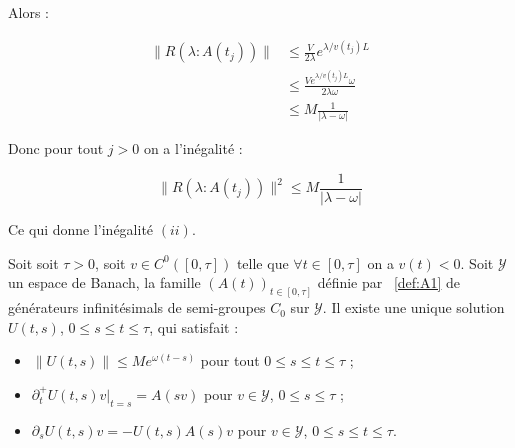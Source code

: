 \documentclass[a4paper]{article}
\begin{document}
\begin{preuve}
	Alors :
	
	\[
	\begin{split}
		\displaystyle \|R(\lambda:A(t_j)) \| &\leq  \frac{V}{2\lambda} e^{\lambda/v(t_j)L}\\
		                                     &\leq \frac{ V e^{\lambda/v(t_j)L} \omega}{2\lambda \omega}\\
											 &\leq M \frac{1}{|\lambda - \omega|}
	\end{split}
	\]
	
 	Donc pour tout $j>0$ on a l'inégalité :
	
 	\begin{equation}
 		\displaystyle \|R(\lambda:A(t_j)) \|^2 \leq M \frac{1}{|\lambda - \omega|}
 	\end{equation}
	
	Ce qui donne l'inégalité $(ii)$.
\end{preuve}

\begin{proposition}
	\label{prop:cas1}
	Soit soit $\tau>0$, soit $v \in C^0([0,\tau])$ telle que $\forall t \in [0,\tau]$ on a $v(t)<0$.
	Soit $\mathscr{Y}$ un espace de Banach, la famille $(A(t))_{t \in [0,\tau]}$ 
	définie par ~\eqref{def:A1}
	de générateurs infinitésimals de semi-groupes $C_0$ sur $\mathscr{Y}$.
	Il existe une unique solution $U(t,s)$, $0\leq s \leq t \leq \tau $, qui satisfait :
	\begin{itemize}
		\item $\|U(t,s)\| \leq M e^{\omega(t-s)}$ pour tout $0\leq s \leq t\leq \tau$ ;
		\item $\partial_t^+ U(t,s)v|_{t=s} = A(sv)$ pour $v\in \mathscr{Y}$, $0\leq s\leq \tau$ ;
		\item $\partial_s U(t,s)v = - U(t,s)A(s)v$ pour $v\in \mathscr{Y}$, $0\leq s\leq t\leq \tau$.
	\end{itemize}
\end{proposition}
\end{document}
